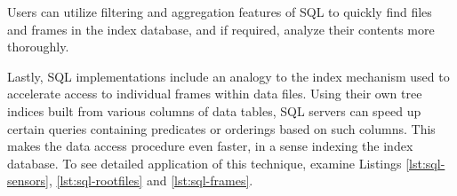 Users can utilize filtering and aggregation features of SQL to quickly find files and frames in the index database, and if required, analyze their contents more thoroughly.

Lastly, SQL implementations include an analogy to the index mechanism used to accelerate access to individual frames within data files. Using their own tree indices built from various columns of data tables, SQL servers can speed up certain queries containing predicates or orderings based on such columns. This makes the data access procedure even faster, in a sense indexing the index database. To see detailed application of this technique, examine Listings \ref{lst:sql-sensors}, \ref{lst:sql-rootfiles} and \ref{lst:sql-frames}.


